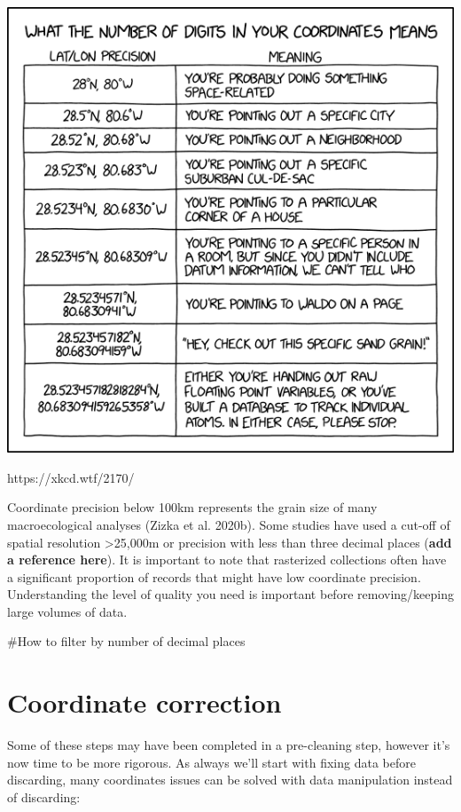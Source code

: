 \documentclass[
  letterpaper,
  DIV=11,
  numbers=noendperiod,
  oneside]{scrreprt}
\newenvironment{Shaded}{\begin{snugshade}}{\end{snugshade}}
\newcommand{\CommentTok}[1]{\textcolor[rgb]{0.37,0.37,0.37}{#1}}
\begin{document}
\includegraphics{images/image-613988507.png}

https://xkcd.wtf/2170/

Coordinate precision below 100km represents the grain size of many
macroecological analyses (Zizka et al. 2020b). Some studies have used a
cut-off of spatial resolution \textgreater25,000m or precision with less
than three decimal places (\textbf{add a reference here}). It is
important to note that rasterized collections often have a significant
proportion of records that might have low coordinate precision.
Understanding the level of quality you need is important before
removing/keeping large volumes of data.

\begin{Shaded}
\begin{Highlighting}[]
\CommentTok{\#How to filter by number of decimal places}
\end{Highlighting}
\end{Shaded}

\hypertarget{coordinate-correction}{%
\section{Coordinate correction}\label{coordinate-correction}}

Some of these steps may have been completed in a pre-cleaning step,
however it's now time to be more rigorous. As always we'll start with
fixing data before discarding, many coordinates issues can be solved
with data manipulation instead of discarding:
\end{document}
